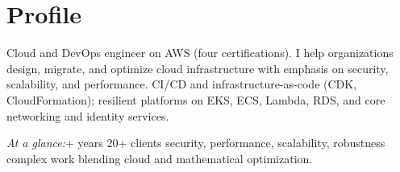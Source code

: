 \section*{Profile}

{\color{cvmuted}
Cloud and DevOps engineer on AWS (four certifications). I help organizations design, migrate, and optimize cloud infrastructure with emphasis on security, scalability, and performance. CI/CD and infrastructure-as-code (CDK, CloudFormation); resilient platforms on EKS, ECS, Lambda, RDS, and core networking and identity services.

\smallskip
\noindent
\textit{At a glance:}+ years \textbullet{} 20+ clients \textbullet{} security, performance, scalability, robustness \textbullet{} complex work blending cloud and mathematical optimization.
}
